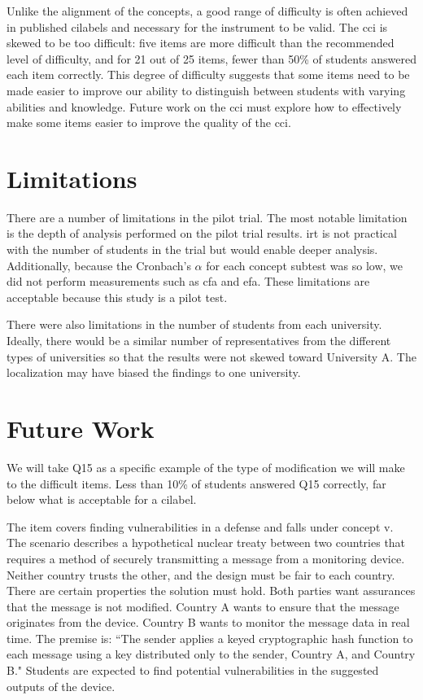 Unlike the alignment of the concepts, a good range of difficulty is often achieved in published \glspl{cilabel} and necessary for the instrument to be valid. The \gls{cci} is skewed to be too difficult: five items are more difficult than the recommended level of difficulty, and for 21 out of 25 items, fewer than 50\% of students answered each item correctly. This degree of difficulty suggests that some items need to be made easier to improve our ability to distinguish between students with varying abilities and knowledge. Future work on the \gls{cci} must explore how to effectively make some items easier to improve the quality of the \gls{cci}.  

\section{Limitations}

There are a number of limitations in the pilot trial. The most notable limitation is the depth of analysis performed on the pilot trial results. \gls{irt} is not practical with the number of students in the trial but would enable deeper analysis. Additionally, because the Cronbach's $\alpha$ for each concept subtest was so low, we did not perform measurements such as \gls{cfa} and \gls{efa}.  These limitations are acceptable because this study is a pilot test.


There were also limitations in the number of students from each university. Ideally, there would be a similar number of representatives from the different types of universities so that the results were not skewed toward University A. The localization may have biased the findings to one university.

\section{Future Work}

We will take Q15 as a specific example of the type of modification we will make to the difficult items. Less than 10\% of students answered Q15 correctly, far below what is acceptable for a \gls{cilabel}. 

The item covers finding vulnerabilities in a defense and falls under concept \gls{v}. The scenario describes a hypothetical nuclear treaty between two countries that requires a method of securely transmitting a message from a monitoring device. Neither country trusts the other, and the design must be fair to each country. There are certain properties the solution must hold. Both parties want assurances that the message is not modified. Country A wants to ensure that the message originates from the device. Country B wants to monitor the message data in real time. The premise is: ``The sender applies a keyed cryptographic hash function to each message using a key distributed only to the sender, Country A, and Country B." Students are expected to find potential vulnerabilities in the suggested outputs of the device.

